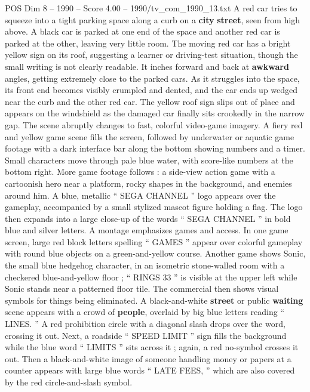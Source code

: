 \begin{textsample}{POS Dim 8 – 1990 – Score 4.00 – 1990/tv\_com\_1990\_13.txt}  \label{ex:f8_pos_069}
A red car tries to squeeze into a tight parking space along a curb on a \textbf{city} \textbf{street}, seen from high above.
A black car is parked at one end of the space and another red car is parked at the other, leaving very little room.
The moving red car has a bright yellow sign on its roof, suggesting a learner or driving-test situation, though the small writing is not clearly readable.
It inches forward and back at \textbf{awkward} angles, getting extremely close to the parked cars.
As it struggles into the space, its front end becomes visibly crumpled and dented, and the car ends up wedged near the curb and the other red car.
The yellow roof sign slips out of place and appears on the windshield as the damaged car finally sits crookedly in the narrow gap.
The scene abruptly changes to fast, colorful video-game imagery.
A fiery red and yellow game scene fills the screen, followed by underwater or aquatic game footage with a dark interface bar along the bottom showing numbers and a timer.
Small characters move through pale blue water, with score-like numbers at the bottom right.
More game footage follows : a side-view action game with a cartoonish hero near a platform, rocky shapes in the background, and enemies around him.
A blue, metallic “ SEGA CHANNEL ” logo appears over the gameplay, accompanied by a small stylized mascot figure holding a flag.
The logo then expands into a large close-up of the words “ SEGA CHANNEL ” in bold blue and silver letters.
A montage emphasizes games and access.
In one game screen, large red block letters spelling “ GAMES ” appear over colorful gameplay with round blue objects on a green-and-yellow course.
Another game shows Sonic, the small blue hedgehog character, in an isometric stone-walled room with a checkered blue-and-yellow floor ; “ RINGS 33 ” is visible at the upper left while Sonic stands near a patterned floor tile.
The commercial then shows visual symbols for things being eliminated.
A black-and-white \textbf{street} or public \textbf{waiting} scene appears with a crowd of \textbf{people}, overlaid by big blue letters reading “ LINES. ” A red prohibition circle with a diagonal slash drops over the word, crossing it out.
Next, a roadside “ SPEED LIMIT ” sign fills the background while the blue word “ LIMITS ” sits across it ; again, a red no-symbol crosses it out.
Then a black-and-white image of someone handling money or papers at a counter appears with large blue words “ LATE FEES, ” which are also covered by the red circle-and-slash symbol.

\end{textsample}
